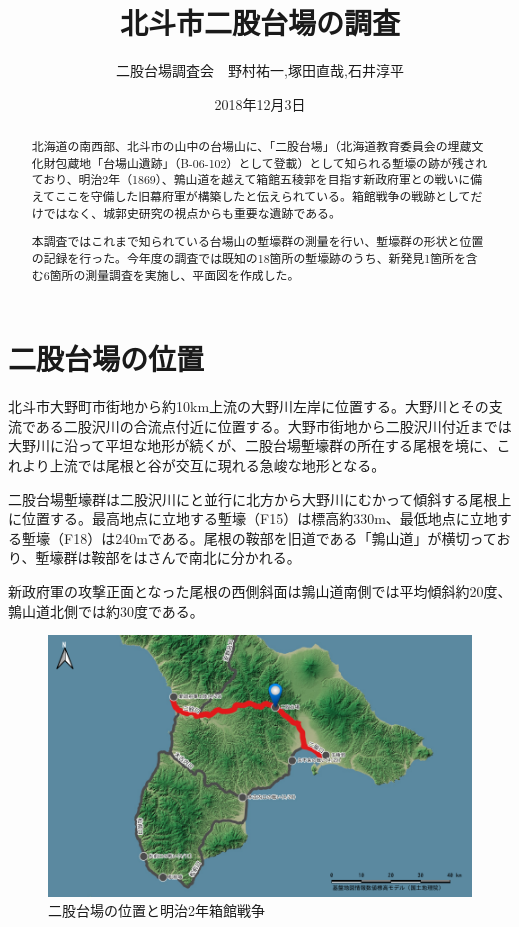 \documentclass[14Q]{jsarticle}
\title{北斗市二股台場の調査}%
\date{2018年12月3日}
\author{二股台場調査会　野村祐一,塚田直哉,石井淳平}              %
\begin{document}
\maketitle
\begin{abstract}
北海道の南西部、北斗市の山中の台場山に、「二股台場」（北海道教育委員会の埋蔵文化財包蔵地「台場山遺跡」（B-06-102）として登載）として知られる塹壕の跡が残されており、明治2年（1869）、鶉山道を越えて箱館五稜郭を目指す新政府軍との戦いに備えてここを守備した旧幕府軍が構築したと伝えられている。箱館戦争の戦跡としてだけではなく、城郭史研究の視点からも重要な遺跡である。

本調査ではこれまで知られている台場山の塹壕群の測量を行い、塹壕群の形状と位置の記録を行った。今年度の調査では既知の18箇所の塹壕跡のうち、新発見1箇所を含む6箇所の測量調査を実施し、平面図を作成した。
\end{abstract}

\section{二股台場の位置}
北斗市大野町市街地から約10km上流の大野川左岸に位置する。大野川とその支流である二股沢川の合流点付近に位置する。大野市街地から二股沢川付近までは大野川に沿って平坦な地形が続くが、二股台場塹壕群の所在する尾根を境に、これより上流では尾根と谷が交互に現れる急峻な地形となる。

二股台場塹壕群は二股沢川にと並行に北方から大野川にむかって傾斜する尾根上に位置する。最高地点に立地する塹壕（F15）は標高約330m、最低地点に立地する塹壕（F18）は240mである。尾根の鞍部を旧道である「鶉山道」が横切っており、塹壕群は鞍部をはさんで南北に分かれる。

新政府軍の攻撃正面となった尾根の西側斜面は鶉山道南側では平均傾斜約20度、鶉山道北側では約30度である。

\begin{figure}[h]
\centering
\includegraphics[width=160truemm]{fig/dounan.pdf}
\caption{二股台場の位置と明治2年箱館戦争}
\end{figure}
\end{document}
